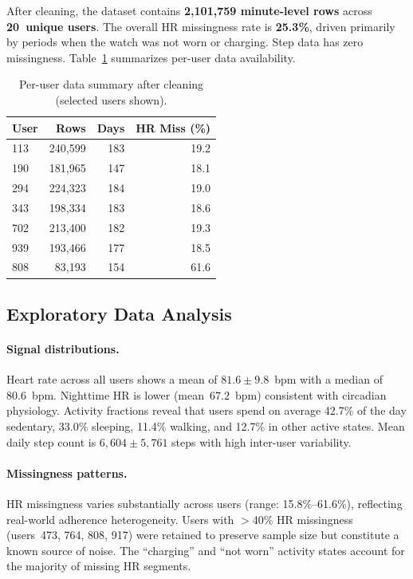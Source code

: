 \documentclass[11pt,a4paper]{article}
\begin{document}
After cleaning, the dataset contains \textbf{2{,}101{,}759 minute-level rows}
across \textbf{20~unique users}.  The overall HR missingness rate is
\textbf{25.3\%}, driven primarily by periods when the watch was not worn or
charging.  Step data has zero missingness.  Table~\ref{tab:usersummary}
summarizes per-user data availability.

\begin{table}[H]
\centering
\caption{Per-user data summary after cleaning (selected users shown).}
\label{tab:usersummary}
\small
\begin{tabular}{lrrr}
\toprule
\textbf{User} & \textbf{Rows} & \textbf{Days} & \textbf{HR Miss (\%)} \\
\midrule
113 & 240{,}599 & 183 & 19.2 \\
190 & 181{,}965 & 147 & 18.1 \\
294 & 224{,}323 & 184 & 19.0 \\
343 & 198{,}334 & 183 & 18.6 \\
702 & 213{,}400 & 182 & 19.3 \\
939 & 193{,}466 & 177 & 18.5 \\
808 &  83{,}193 & 154 & 61.6 \\
\bottomrule
\end{tabular}
\end{table}

\subsection{Exploratory Data Analysis}

\paragraph{Signal distributions.}
Heart rate across all users shows a mean of $81.6 \pm 9.8$~bpm with a median of
80.6~bpm.  Nighttime HR is lower (mean~$67.2$~bpm) consistent with circadian
physiology.  Activity fractions reveal that users spend on average 42.7\% of the
day sedentary, 33.0\% sleeping, 11.4\% walking, and 12.7\% in other active
states.  Mean daily step count is $6{,}604 \pm 5{,}761$ steps with high
inter-user variability.

\paragraph{Missingness patterns.}
HR missingness varies substantially across users (range: 15.8\%--61.6\%),
reflecting real-world adherence heterogeneity.  Users with $>$40\% HR
missingness (users~473, 764, 808, 917) were retained to preserve sample size
but constitute a known source of noise.  The ``charging'' and ``not worn''
activity states account for the majority of missing HR segments.
\end{document}
